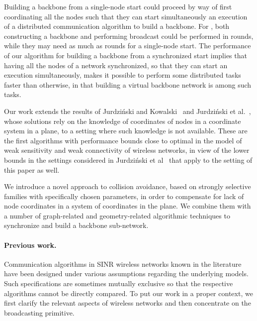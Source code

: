 \documentclass[11pt]{article}
\newcommand{\BBB}{\vspace*{-\bigskipamount}}
\newcommand{\Paragraph}[1]{\BBB\paragraph{#1}}
\begin{document}
Building a backbone from a single-node start could proceed by way of first coordinating all the nodes such that they can start simultaneously an execution of a distributed communication algorithm to build a backbone.
For , both constructing a backbone and performing broadcast could be performed in  rounds, while they may need as much as  rounds  for a single-node start. 
The performance of our algorithm for building a backbone from a synchronized start implies that having all the nodes of a network synchronized, so that they can start an execution
simultaneously, makes it possible to perform some distributed tasks faster than otherwise, in that  building a virtual backbone network is among such tasks.


Our work  extends the results of Jurdzi\'nski and Kowalski~\cite{JK-DISC12} and Jurdzi\'nski et al.~\cite{JKS-ICALP-13}, whose solutions rely on the knowledge of coordinates of nodes in a coordinate system in a plane, to a setting where such knowledge is not available.
These are the first algorithms with performance bounds close to optimal in the  model of weak sensitivity and weak connectivity  of wireless networks, in view of the lower bounds in the settings considered in Jurdzi\'nski et al~\cite{JKS-ICALP-13} that apply to the setting of this paper as well.

We introduce a novel approach to collision avoidance, based on strongly selective families with specifically chosen parameters, in order to compensate for lack of node coordinates in a system of coordinates in the plane.
We combine them with a number of graph-related and geometry-related algorithmic techniques to synchronize and build a backbone sub-network.



\Paragraph{Previous work.}



Communication algorithms in SINR wireless networks known in the literature have been designed under various assumptions regarding the underlying models. 
Such specifications are sometimes mutually exclusive so that the respective algorithms cannot be directly compared.  
To put our work in a proper context, we first clarify the relevant aspects of wireless networks and then concentrate on the broadcasting primitive.
\end{document}
